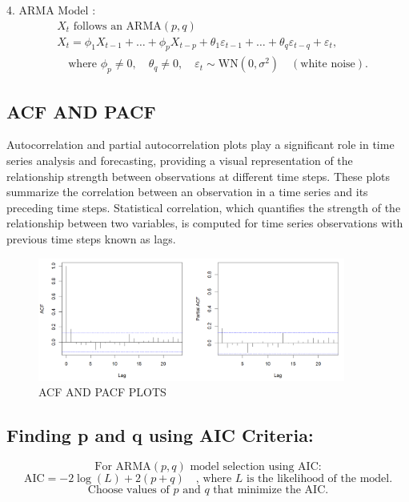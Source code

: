 \documentclass{article}
\begin{document}
4. ARMA Model :
\[
\begin{aligned}
& X_t \text{ follows an ARMA}(p, q) \quad  \\
& X_t = \phi_1 X_{t-1} + \ldots + \phi_p X_{t-p} + \theta_1 \varepsilon_{t-1} + \ldots + \theta_q \varepsilon_{t-q} + \varepsilon_t, \\
& \quad \text{where } \phi_p \neq 0, \quad \theta_q \neq 0, \quad \varepsilon_t \sim \text{WN}(0, \sigma^2) \quad (\text{white noise}).
\end{aligned}
\]
\subsection{ACF AND PACF }

Autocorrelation and partial autocorrelation plots play a significant role in time series analysis and forecasting, providing a visual representation of the relationship strength between observations at different time steps. These plots summarize the correlation between an observation in a time series and its preceding time steps. Statistical correlation, which quantifies the strength of the relationship between two variables, is computed for time series observations with previous time steps known as lags. 
\begin{figure}[h]
    \centering
    \includegraphics[width=0.9\textwidth]{acf_pacf.png}
    \caption{ACF AND PACF PLOTS}
    \label{fig:label5}
\end{figure}
\newpage

\subsection{Finding p and q using AIC Criteria:}
\[
\text{For ARMA}(p, q) \text{ model selection using AIC:}
\]
\[
\text{AIC} = -2 \log(L) + 2(p+q) \quad \text{, where } L \text{ is the likelihood of the model.}
\]
\[
\text{Choose values of } p \text{ and } q \text{ that minimize the AIC.}
\]
\end{document}
